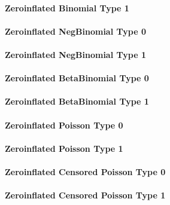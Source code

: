 \documentclass[a4paper,11pt]{article}
\begin{document}
\paragraph{Zeroinflated Binomial Type 1}


\paragraph{Zeroinflated NegBinomial Type 0}


\paragraph{Zeroinflated NegBinomial Type 1}


\paragraph{Zeroinflated BetaBinomial Type 0}


\paragraph{Zeroinflated BetaBinomial Type 1}


\paragraph{Zeroinflated Poisson Type 0}


\paragraph{Zeroinflated Poisson Type 1}


\paragraph{Zeroinflated Censored Poisson Type 0}


\paragraph{Zeroinflated Censored Poisson Type 1}

\end{document}
